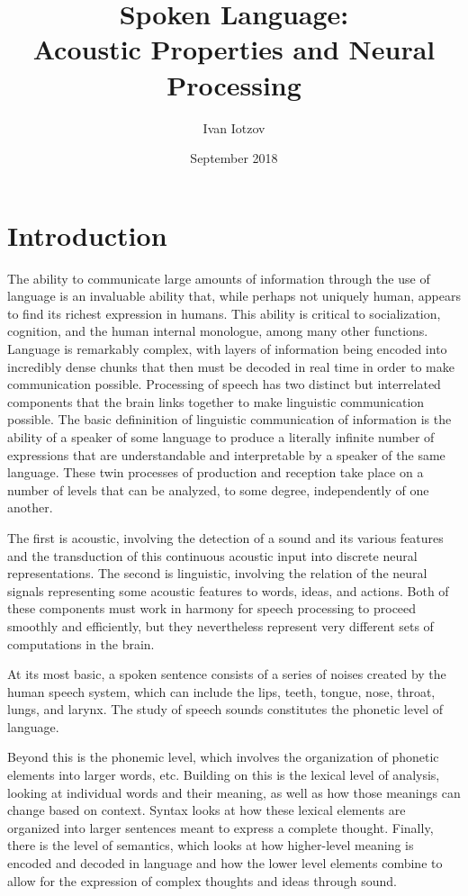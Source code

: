 \documentclass[titlepage]{article}
\title{Spoken Language:\\ Acoustic Properties and Neural Processing}
\author{Ivan Iotzov}
\date{September 2018}
\begin{document}

\maketitle


\section{Introduction} \label{intro}

  The ability to communicate large amounts of information through the use of
  language is an invaluable ability that, while perhaps not uniquely human,
  appears to find its richest expression in humans. This ability is critical to
  socialization, cognition, and the human internal monologue, among many other functions.
  Language is remarkably complex, with layers of information being encoded
  into incredibly dense chunks that then must be decoded in real time in order to make
  communication possible. Processing of speech has two distinct but interrelated
  components that the brain links together to make linguistic communication possible.
  The basic defininition of linguistic communication of information is the ability
  of a speaker of some language to produce a literally infinite number of expressions
  that are understandable and interpretable by a speaker of the same language.
  These twin processes of production and reception take place on a number of levels
  that can be analyzed, to some degree, independently of one another.


  The first is acoustic, involving the detection of a sound and its various features
  and the transduction of this continuous acoustic input into discrete neural representations.
  The second is linguistic, involving the relation of the neural signals representing
  some acoustic features to words, ideas, and actions.
  Both of these components must work in harmony for speech processing to proceed
  smoothly and efficiently, but they nevertheless represent very different sets
  of computations in the brain.


  At its most basic, a spoken sentence consists of a series of noises
  created by the human speech system, which can include the lips, teeth, tongue,
  nose, throat, lungs, and larynx. The study of speech sounds constitutes the
  phonetic level of language.


  Beyond this is the phonemic level, which involves the organization
  of phonetic elements into larger words, etc. Building on this is the
  lexical level of analysis, looking at individual words and their meaning, as
  well as how those meanings can change based on context. Syntax looks at how these lexical
  elements are organized into larger sentences meant to express a complete thought. Finally,
  there is the level of semantics, which looks at how higher-level meaning is encoded
  and decoded in language and how the lower level elements combine to
  allow for the expression of complex thoughts and ideas through sound.
\end{document}
